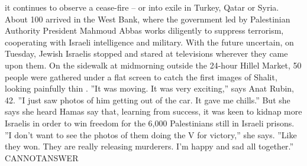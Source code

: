 \documentclass[11pt,a4paper, onecolumn]{article}
\begin{document}
it continues to observe a cease-fire -- or into exile in Turkey, Qatar or Syria. About 100 arrived in the West Bank, where the government led by Palestinian Authority President Mahmoud Abbas works diligently to suppress terrorism, cooperating with Israeli intelligence and military. With the future uncertain, on Tuesday, Jewish Israelis stopped and stared at televisions wherever they came upon them. On the sidewalk at midmorning outside the 24-hour Hillel Market, 50 people were gathered under a flat screen to catch the first images of Shalit, looking painfully thin . ''It was moving. It was very exciting,'' says Anat Rubin, 42. ''I just saw photos of him getting out of the car. It gave me chills.'' But she says she heard Hamas say that, learning from success, it was keen to kidnap more Israelis in order to win freedom for the 6,000 Palestinians still in Israeli prisons. ''I don't want to see the photos of them doing the V for victory,'' she says. ''Like they won. They are really releasing murderers. I'm happy and sad all together.'' CANNOTANSWER
\end{document}

